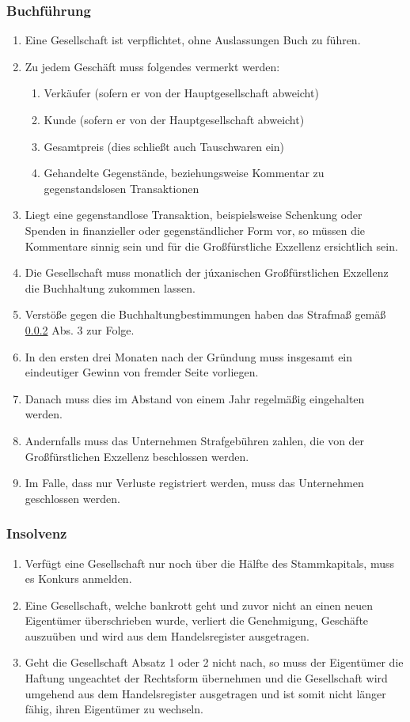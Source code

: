 \documentclass{article}
\begin{document}
\subsubsection{Buchführung} \label{buch}
\begin{enumerate}[(1)]
    \item Eine Gesellschaft ist verpflichtet, ohne Auslassungen Buch zu führen.
    \item Zu jedem Geschäft muss folgendes vermerkt werden:
    \begin{enumerate}[1.]
        \item Verkäufer (sofern er von der Hauptgesellschaft abweicht)
        \item Kunde (sofern er von der Hauptgesellschaft abweicht)
        \item Gesamtpreis (dies schließt auch Tauschwaren ein)
        \item Gehandelte Gegenstände, beziehungsweise Kommentar zu gegenstandslosen Transaktionen
    \end{enumerate}
    \item Liegt eine gegenstandlose Transaktion, beispielsweise Schenkung oder Spenden in finanzieller oder gegenständlicher Form  vor, so müssen die Kommentare sinnig sein und für die Großfürstliche Exzellenz ersichtlich sein.
    \item Die Gesellschaft muss monatlich der júxanischen Großfürstlichen Exzellenz die Buchhaltung zukommen lassen.
    \item Verstöße gegen die Buchhaltungbestimmungen haben das Strafmaß gemäß \ref{apored} Abs. 3 zur Folge.
    \item In den ersten drei Monaten nach der Gründung muss insgesamt ein eindeutiger Gewinn von fremder Seite vorliegen.
    \item Danach muss dies im Abstand von einem Jahr regelmäßig eingehalten werden.
    \item Andernfalls muss das Unternehmen Strafgebühren zahlen, die von der Großfürstlichen Exzellenz beschlossen werden.
    \item Im Falle, dass nur Verluste registriert werden, muss das Unternehmen geschlossen werden.
\end{enumerate}


\subsubsection{Insolvenz} \label{apored}
\begin{enumerate}[(1)]
    \item Verfügt eine Gesellschaft nur noch über die Hälfte des Stammkapitals, muss es Konkurs anmelden.
    \item Eine Gesellschaft, welche bankrott geht und zuvor nicht an einen neuen Eigentümer überschrieben wurde, verliert die Genehmigung, Geschäfte auszuüben und wird aus dem Handelsregister ausgetragen.
    \item Geht die Gesellschaft Absatz 1 oder 2 nicht nach, so muss der Eigentümer die Haftung ungeachtet der Rechtsform übernehmen und die Gesellschaft wird umgehend aus dem Handelsregister ausgetragen und ist somit nicht länger fähig, ihren Eigentümer zu wechseln.
\end{enumerate}
\end{document}
